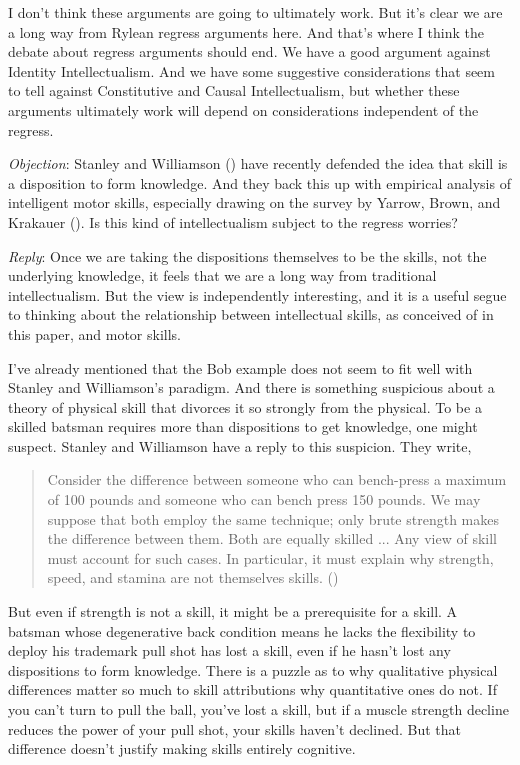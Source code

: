 \documentclass[
  11pt,
  letterpaper,
  DIV=11,
  numbers=noendperiod,
  oneside]{scrartcl}
\begin{document}
I don't think these arguments are going to ultimately work. But it's
clear we are a long way from Rylean regress arguments here. And that's
where I think the debate about regress arguments should end. We have a
good argument against Identity Intellectualism. And we have some
suggestive considerations that seem to tell against Constitutive and
Causal Intellectualism, but whether these arguments ultimately work will
depend on considerations independent of the regress.

\emph{Objection}: Stanley and Williamson
() have recently defended the
idea that skill is a disposition to form knowledge. And they back this
up with empirical analysis of intelligent motor skills, especially
drawing on the survey by Yarrow, Brown, and Krakauer
(). Is this kind of intellectualism
subject to the regress worries?

\emph{Reply}: Once we are taking the dispositions themselves to be the
skills, not the underlying knowledge, it feels that we are a long way
from traditional intellectualism. But the view is independently
interesting, and it is a useful segue to thinking about the relationship
between intellectual skills, as conceived of in this paper, and motor
skills.

I've already mentioned that the Bob example does not seem to fit well
with Stanley and Williamson's paradigm. And there is something
suspicious about a theory of physical skill that divorces it so strongly
from the physical. To be a skilled batsman requires more than
dispositions to get knowledge, one might suspect. Stanley and Williamson
have a reply to this suspicion. They write,

\begin{quote}
Consider the difference between someone who can bench-press a maximum of
100 pounds and someone who can bench press 150 pounds. We may suppose
that both employ the same technique; only brute strength makes the
difference between them. Both are equally skilled ... Any view of skill
must account for such cases. In particular, it must explain why
strength, speed, and stamina are not themselves skills.
()
\end{quote}

But even if strength is not a skill, it might be a prerequisite for a
skill. A batsman whose degenerative back condition means he lacks the
flexibility to deploy his trademark pull shot has lost a skill, even if
he hasn't lost any dispositions to form knowledge. There is a puzzle as
to why qualitative physical differences matter so much to skill
attributions why quantitative ones do not. If you can't turn to pull the
ball, you've lost a skill, but if a muscle strength decline reduces the
power of your pull shot, your skills haven't declined. But that
difference doesn't justify making skills entirely cognitive.
\end{document}
